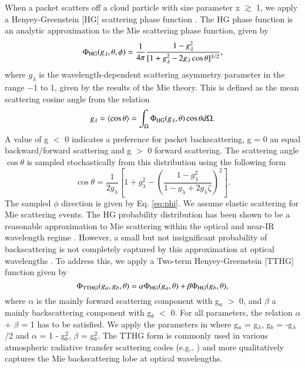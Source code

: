 \documentclass{aa}
\begin{document}
When a packet scatters off a cloud particle with size parameter x $\gtrsim$ 1, we apply a Henyey-Greenstein [HG] scattering phase function \citep{Henyey1941}.
The HG phase function is an analytic approximation to the Mie scattering phase function, given by
\begin{equation}
\label{eq:HG}
 \Phi_{\rm HG}(g_{\lambda}, \theta, \phi) = \frac{1}{4\pi}\frac{1 - g_{\lambda}^{2}}{[1 + g_{\lambda}^{2} - 2g_{\lambda}\cos\theta]^{3/2}},
\end{equation}
where $g_{\lambda}$ is the wavelength-dependent scattering asymmetry parameter in the range $-$1 to 1, given by the results of the Mie theory.
This is defined as the mean scattering cosine angle from the relation
\begin{equation}
\label{eq:mean_cosine}
g_{\lambda} = \langle \cos\theta\rangle = \int_{\Omega} \Phi_{\rm HG}(g_{\lambda}, \theta)\cos\theta d\Omega .
\end{equation}
A value of g $<$ 0 indicates a preference for packet backscattering, g = 0 an equal backward/forward scattering and g $>$ 0 forward scattering.
The scattering angle $\cos\theta$ is sampled stochastically from this distribution using the following form
\begin{equation}
\label{eq:HG_scat}
\cos\theta = \frac{1}{2g_{\lambda}}\left[1 + g_{\lambda}^{2} - \left(\frac{1 - g_{\lambda}^{2}}{1 - g_{\lambda} + 2g_{\lambda}\zeta}\right)^{2}\right].
\end{equation}
The sampled $\phi$ direction is given by Eq. \eqref{eq:phi}.
We assume elastic scattering for Mie scattering events.
The HG probability distribution has been shown to be a reasonable approximation to Mie scattering within the optical and near-IR wavelength regime \citep{Draine2003}.
However, a small but not insignificant probability of backscattering is not completely captured by this approximation at optical wavelengths \citep[e.g.][]{Kattawar1975, Draine2003, Hood2008, Dyudina2016}.
To address this, we apply a Two-term Henyey-Greenstein [TTHG] function \citep[e.g..][]{Pfeiffer2008, Cahoy2010, Dyudina2016} given by
\begin{equation}
\Phi_{\rm TTHG}(g_{a}, g_{b}, \theta) = \alpha \Phi_{\rm HG}(g_{a}, \theta) + \beta \Phi_{\rm HG}(g_{b}, \theta), 
\end{equation}
where $\alpha$ is the mainly forward scattering component with g$_{a}$ $>$ 0,  and $\beta$ a mainly backscattering component with g$_{b}$ $<$ 0.
For all parameters, the relation $\alpha$ + $\beta$ = 1 has to be satisfied.
We apply the parameters in \citet{Cahoy2010} where g$_{a}$ = g$_{\lambda}$, g$_{b}$ = -g$_{\lambda}$/2 and $\alpha$ = 1 - g$_{b}^{2}$, $\beta$ = g$_{b}^{2}$.
The TTHG form is commonly used in various atmospheric radiative transfer scattering codes (e.g.. \citealt{Marley1999,Cahoy2010,Barstow2014,Munoz2015,Dyudina2016}) and more qualitatively captures the Mie backscattering lobe at optical wavelengths.
\end{document}
